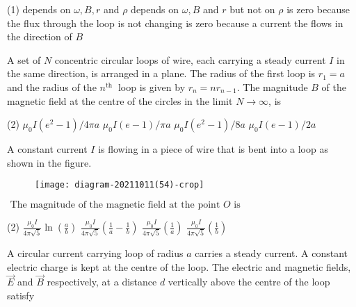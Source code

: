 \begin{enumerate}
\begin{minipage}{\textwidth}
\end{minipage}
\begin{tasks}(1)
	\task[\textbf{A.}] depends on $\omega, B, r$ and $\rho$
	\task[\textbf{B.}]depends on $\omega, B$ and $r$ but not on $\rho$
	\task[\textbf{C.}]is zero because the flux through the loop is not changing
	\task[\textbf{D.}]is zero because a current the flows in the direction of $B$
\end{tasks}
\begin{minipage}{\textwidth}
	\item A set of $N$ concentric circular loops of wire, each carrying a steady current $I$ in the same direction, is arranged in a plane. The radius of the first loop is $r_{1}=a$ and the radius of the $n^{\text {th }}$ loop is given by $r_{n}=n r_{n-1}$. The magnitude $B$ of the magnetic field at the centre of the circles in the limit $N \rightarrow \infty$, is
\end{minipage}
\begin{tasks}(2)
	\task[\textbf{A.}] $\mu_{0} I\left(e^{2}-1\right) / 4 \pi a$
	\task[\textbf{B.}]$\mu_{0} I(e-1) / \pi a$
	\task[\textbf{C.}]$\mu_{0} I\left(e^{2}-1\right) / 8 a$
	\task[\textbf{D.}]$\mu_{0} I(e-1) / 2 a$
\end{tasks}
\begin{minipage}{\textwidth}
	\item A constant current $I$ is flowing in a piece of wire that is bent into a loop as shown in the figure.\\
	\begin{figure}[H]
		\centering
		\texttt{[image: diagram-20211011(54)-crop]}
	\end{figure}
	$\text { The magnitude of the magnetic field at the point } O \text { is }$
\end{minipage}
\begin{tasks}(2)
	\task[\textbf{A.}] $\frac{\mu_{0} I}{4 \pi \sqrt{5}} \ln \left(\frac{a}{b}\right)$
	\task[\textbf{B.}]$\frac{\mu_{0} I}{4 \pi \sqrt{5}}\left(\frac{1}{a}-\frac{1}{b}\right)$
	\task[\textbf{C.}]$\frac{\mu_{0} I}{4 \pi \sqrt{5}}\left(\frac{1}{a}\right)$
	\task[\textbf{D.}]$\frac{\mu_{0} I}{4 \pi \sqrt{5}}\left(\frac{1}{b}\right)$
\end{tasks}
\begin{minipage}{\textwidth}
	\item A circular current carrying loop of radius $a$ carries a steady current. A constant electric charge is kept at the centre of the loop. The electric and magnetic fields, $\vec{E}$ and $\vec{B}$ respectively, at a distance $d$ vertically above the centre of the loop satisfy

\end{minipage}
\end{enumerate}
